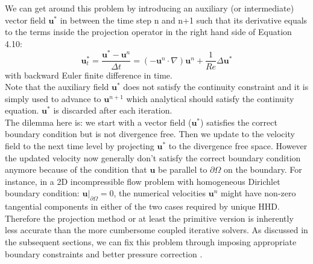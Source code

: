 We can get around this problem by introducing an auxiliary (or intermediate) vector field $\textbf{u}^*$ in between the time step n and n+1 such that its derivative equals to the terms inside the projection operator in the right hand side of Equation 4.10:\\
\begin{dmath}
\textbf{u}^*_t = \dfrac{\textbf{u}^* - \textbf{u}^n}{\Delta t} = (-\textbf{u}^{n} \cdot \nabla) \textbf{u}^{n} + \dfrac{1}{Re} \Delta \textbf{u}^*
\end{dmath}
with backward Euler finite difference in time.\\

Note that the auxiliary field $\textbf{u}^*$ does not satisfy the continuity constraint and it is simply used to advance to $\textbf{u}^{n+1}$ which analytical should satisfy the continuity equation. $\textbf{u}^*$ is discarded after each iteration.\\
The dilemma here is: we start with a vector field ($\textbf{u}^*$) satisfies the correct boundary condition but is not divergence free. Then we update to the velocity field to the next time level by projecting $\textbf{u}^*$ to the divergence free space. However the updated velocity now generally don't satisfy the correct boundary condition anymore because of the condition that $\textbf{u}$ be parallel to $\partial \Omega$ on the boundary. For instance, in a 2D incompressible flow problem with homogeneous Dirichlet boundary condition: $\textbf{u}|_{\partial \Omega} = 0$, the numerical velocities $\textbf{u}^n$ might have non-zero tangential components in either of the two cases required by unique HHD. Therefore the projection method or at least the primitive version is inherently less accurate than the more cumbersome coupled iterative solvers. As discussed in the subsequent sections, we can fix this problem through imposing appropriate boundary constraints and better pressure correction \cite{brown2001accurate}.\\

